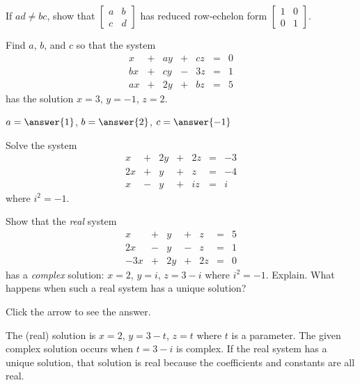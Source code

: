 \documentclass{ximera}
\begin{document}
\begin{problem}\label{prb:rref_nonsingular}
If $ad \neq bc$, show that $\begin{bmatrix}
a & b \\
c & d
\end{bmatrix}$ has reduced row-echelon form $\begin{bmatrix}
 1 & 0 \\
 0 & 1
 \end{bmatrix}$.
\end{problem}

\begin{problem}\label{prb:coeffs}
Find $a$, $b$, and $c$ so that the system
\begin{equation*}
\begin{array}{rlrlrcr}
	 x & + &  ay & + &  cz & = &  0 \\
	bx & + &  cy & - &  3z & = &  1 \\
	ax & + &  2y & + &  bz & = &  5
\end{array}
\end{equation*}
has the solution $x = 3$, $y = -1$, $z = 2$.

$a = \answer{1}$, $b = \answer{2}$, $c = \answer{-1}$

\end{problem}

\begin{problem}\label{prb:complex}
Solve the system
$$
\begin{array}{rlrlrcr}
	 x & + &  2y & + &  2z & = & -3 \\
	2x & + &   y & + &   z & = & -4 \\
	 x & - &   y & + &  iz & = &  i
\end{array}
$$
where $i^{2} = -1$. 
\end{problem}

\begin{problem}\label{prb:real_complex}
Show that the \textit{real} system
\begin{equation*}
\begin{array}{rlrlrcr}
	 x & + &   y & + &   z & = &  5 \\
	2x & - &   y & - &   z & = &  1 \\
	-3x& + &  2y & + &  2z & = &  0
\end{array}
\end{equation*}
has a \textit{complex} solution: $x = 2$, $y = i$, $z = 3 - i$ where $i^{2} = -1$. Explain. What happens when such a real system has a unique solution?

Click the arrow to see the answer.
\begin{expandable}
The (real) solution is $x = 2$, $y = 3 - t$, $z = t$ where $t$ is a parameter. The given complex solution occurs when $t = 3 - i$ is complex. If the real system has a unique solution, that solution is real because the coefficients and constants are all real.
\end{expandable}
\end{problem}
\end{document}
